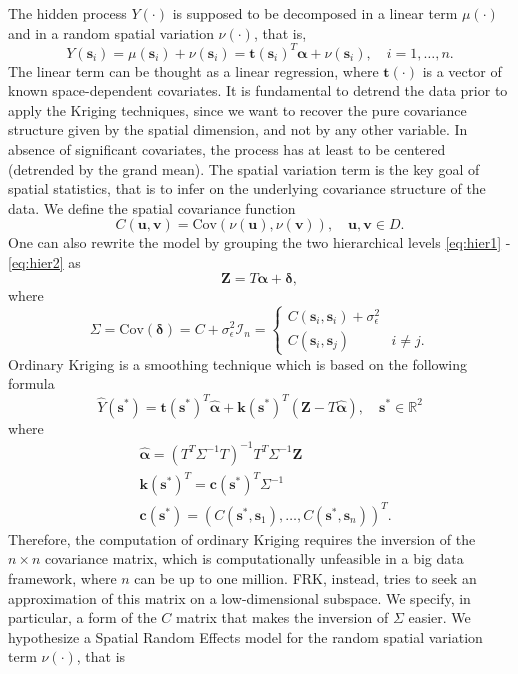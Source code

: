 \documentclass[11pt]{article}
\begin{document}
The hidden process $Y(\cdot)$ is supposed to be decomposed in a linear term $\mu(\cdot)$ and in a random spatial variation $\nu(\cdot)$, that is, 
\begin{equation}
Y (\bm{s}_i) = \mu ( \bm{s}_i) + \nu (\bm{s}_i) = \bm{t}(\bm{s}_i)^T \bm{\alpha} + \nu(\bm{s}_i), \quad i = 1, \dots, n.
\label{eq:hier2}
\end{equation}
The linear term can be thought as a linear regression, where $\bm{t}(\cdot)$ is a vector of known space-dependent covariates. It is fundamental to detrend the data prior to apply the Kriging techniques, since we want to recover the pure covariance structure given by the spatial dimension, and not by any other variable. In absence of significant covariates, the process has at least to be centered (detrended by the grand mean). The spatial variation term is the key goal of spatial statistics, that is to infer on the underlying covariance structure of the data. We define the spatial covariance function $$C(\bm{u}, \bm{v}) = \text{Cov} (\nu(\bm{u}),  \nu(\bm{v})), \quad \bm{u}, \bm{v} \in D.$$ 
One can also rewrite the model by grouping the two hierarchical levels \eqref{eq:hier1} - \eqref{eq:hier2} as
\begin{equation*}
\bm{Z} = T \bm{\alpha} + \bm{\delta}, 
\end{equation*}
where
\begin{equation*}
\Sigma = \text{Cov} (\bm{\delta}) = C + \sigma_\epsilon^2 \mathcal{I}_n =  \begin{cases}
C(\bm{s}_i, \bm{s}_i) + \sigma_\epsilon^2
\\
C(\bm{s}_i, \bm{s}_j) & i \neq j.
\end{cases}
\end{equation*}
Ordinary Kriging is a smoothing technique which is based on the following formula
\begin{equation}
\hat{Y}(\bm{s}^*) = \bm{t}(\bm{s}^*)^T \hat{\bm{\alpha}} + \bm{k}(\bm{s}^*)^T (\bm{Z} - T \hat{\bm{\alpha}}), \quad \bm{s}^* \in \mathbb{R}^2
\end{equation}
where 
\begin{align*}
&\hat{\bm{\alpha}} = (T^T \Sigma^{-1} T)^{-1} T^T \Sigma^{-1} \bm{Z}
\\
&\bm{k}(\bm{s}^*)^T = \bm{c}(\bm{s}^*)^T \Sigma^{-1}
\\
&\bm{c}(\bm{s}^*) = (C(\bm{s}^*, \bm{s}_1), \dots, C(\bm{s}^*, \bm{s}_n))^T.
\end{align*}
Therefore, the computation of ordinary Kriging requires the inversion of the $n \times n$ covariance matrix, which is computationally unfeasible in a big data framework, where $n$ can be up to one million. FRK, instead, tries to seek an approximation of this matrix on a low-dimensional subspace. We specify, in particular, a form of the $C$ matrix that makes the inversion of $\Sigma$ easier. We hypothesize a Spatial Random Effects model for the random spatial variation term $\nu (\cdot)$, that is
\end{document}
